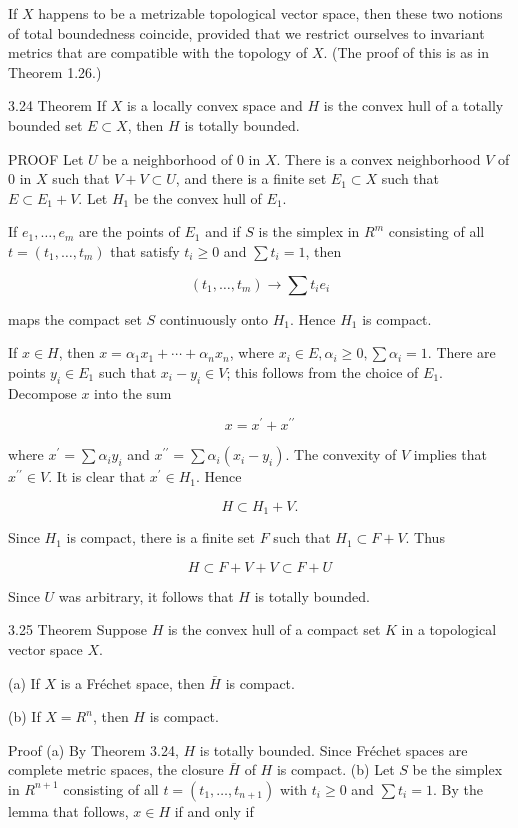 \documentclass[10pt]{article}
\begin{document}
If $X$ happens to be a metrizable topological vector space, then these two notions of total boundedness coincide, provided that we restrict ourselves to invariant metrics that are compatible with the topology of $X$. (The proof of this is as in Theorem 1.26.)

3.24 Theorem If $X$ is a locally convex space and $H$ is the convex hull of a totally bounded set $E \subset X$, then $H$ is totally bounded.

PROOF Let $U$ be a neighborhood of 0 in $X$. There is a convex neighborhood $V$ of 0 in $X$ such that $V+V \subset U$, and there is a finite set $E_{1} \subset X$ such that $E \subset E_{1}+V$. Let $H_{1}$ be the convex hull of $E_{1}$.

If $e_{1}, \ldots, e_{m}$ are the points of $E_{1}$ and if $S$ is the simplex in $R^{m}$ consisting of all $t=\left(t_{1}, \ldots, t_{m}\right)$ that satisfy $t_{i} \geq 0$ and $\sum t_{i}=1$, then

$$
\left(t_{1}, \ldots, t_{m}\right) \rightarrow \sum t_{i} e_{i}
$$

maps the compact set $S$ continuously onto $H_{1}$. Hence $H_{1}$ is compact.

If $x \in H$, then $x=\alpha_{1} x_{1}+\cdots+\alpha_{n} x_{n}$, where $x_{i} \in E, \alpha_{i} \geq 0, \sum \alpha_{i}=1$. There are points $y_{i} \in E_{1}$ such that $x_{i}-y_{i} \in V$; this follows from the choice of $E_{1}$. Decompose $x$ into the sum

$$
x=x^{\prime}+x^{\prime \prime}
$$

where $x^{\prime}=\sum \alpha_{i} y_{i}$ and $x^{\prime \prime}=\sum \alpha_{i}\left(x_{i}-y_{i}\right)$. The convexity of $V$ implies that $x^{\prime \prime} \in V$. It is clear that $x^{\prime} \in H_{1}$. Hence

$$
H \subset H_{1}+V .
$$

Since $H_{1}$ is compact, there is a finite set $F$ such that $H_{1} \subset F+V$. Thus

$$
H \subset F+V+V \subset F+U
$$

Since $U$ was arbitrary, it follows that $H$ is totally bounded.

3.25 Theorem Suppose $H$ is the convex hull of a compact set $K$ in a topological vector space $X$.

(a) If $X$ is a Fréchet space, then $\bar{H}$ is compact.

(b) If $X=R^{n}$, then $H$ is compact.

Proof (a) By Theorem 3.24, $H$ is totally bounded. Since Fréchet spaces are complete metric spaces, the closure $\bar{H}$ of $H$ is compact.
(b) Let $S$ be the simplex in $R^{n+1}$ consisting of all $t=\left(t_{1}, \ldots, t_{n+1}\right)$ with $t_{i} \geq 0$ and $\sum t_{i}=1$. By the lemma that follows, $x \in H$ if and only if
\end{document}
